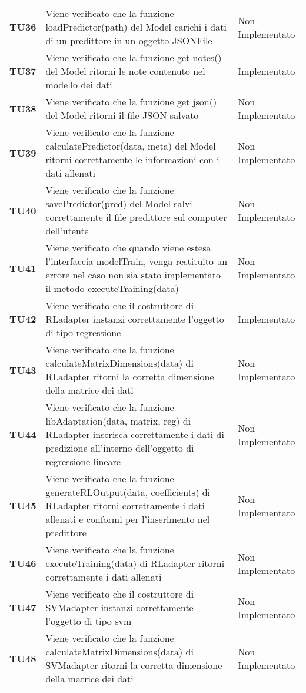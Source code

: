 \documentclass[../piano-di-qualifica.tex]{subfiles}
\begin{document}
\begin{longtable}[H]{>{\centering\bfseries}m{2.5cm} >{\centering}m{7.5cm} >{\centering\arraybackslash}m{3.5cm}}
  \textbf{TU36} & Viene verificato che la funzione loadPredictor(path) del Model carichi i dati di un predittore in un oggetto JSONFile & Non Implementato \\
  \textbf{TU37} & Viene verificato che la funzione get notes() del Model ritorni le note contenuto nel modello dei dati & Implementato \\
  \textbf{TU38} & Viene verificato che la funzione get json() del Model ritorni il file JSON salvato & Non Implementato \\
  \textbf{TU39} & Viene verificato che la funzione calculatePredictor(data, meta) del Model ritorni correttamente le informazioni con i dati allenati & Non Implementato \\
  \textbf{TU40} & Viene verificato che la funzione savePredictor(pred) del Model salvi correttamente il file predittore sul computer dell'utente & Non Implementato \\
  \textbf{TU41} & Viene verificato che quando viene estesa l'interfaccia modelTrain, venga restituito un errore nel caso non sia stato implementato il metodo executeTraining(data) & Non Implementato \\
  \textbf{TU42} & Viene verificato che il costruttore di RLadapter instanzi correttamente l'oggetto di tipo regressione & Implementato \\
  \textbf{TU43} & Viene verificato che la funzione calculateMatrixDimensions(data) di RLadapter ritorni la corretta dimensione della matrice dei dati & Non Implementato \\
  \textbf{TU44} & Viene verificato che la funzione libAdaptation(data, matrix, reg) di RLadapter inserisca correttamente i dati di predizione all'interno dell'oggetto di regressione lineare & Non Implementato \\
  \textbf{TU45} & Viene verificato che la funzione generateRLOutput(data, coefficients) di RLadapter ritorni correttamente i dati allenati e conformi per l'inserimento nel predittore & Non Implementato \\
  \textbf{TU46} & Viene verificato che la funzione executeTraining(data) di RLadapter ritorni correttamente i dati allenati & Non Implementato \\
  \textbf{TU47} & Viene verificato che il costruttore di SVMadapter instanzi correttamente l'oggetto di tipo svm & Non Implementato \\
  \textbf{TU48} & Viene verificato che la funzione calculateMatrixDimensions(data) di SVMadapter ritorni la corretta dimensione della matrice dei dati & Non Implementato \\

\end{longtable}
\end{document}
